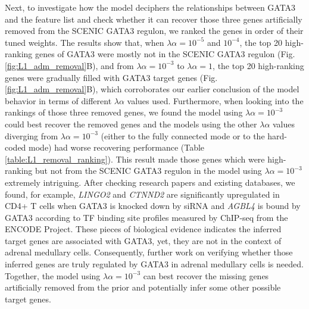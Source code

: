 Next, to investigate how the model deciphers the relationships between GATA3 and the feature list and check whether it can recover those three genes artificially removed from the SCENIC GATA3 regulon, we ranked the genes in order of their tuned weights. The results show that, when $\lambda\alpha = 10^{-5}$ and $10^{-4}$, the top 20 high-ranking genes of GATA3 were mostly not in the SCENIC GATA3 regulon (Fig.\ref{fig:L1_adm_removal}B), and from $\lambda\alpha = 10^{-3}$ to $\lambda\alpha = 1$, the top 20 high-ranking genes were gradually filled with GATA3 target genes (Fig.\ref{fig:L1_adm_removal}B), which corroborates our earlier conclusion of the model behavior in terms of different $\lambda\alpha$ values used. Furthermore, when looking into the rankings of those three removed genes, we found the model using $\lambda\alpha = 10^{-3}$ could best recover the removed genes and the models using the other $\lambda\alpha$ values diverging from $\lambda\alpha = 10^{-3}$ (either to the fully connected mode or to the hard-coded mode) had worse recovering performance (Table \ref{table:L1_removal_ranking}). This result made those genes which were high-ranking but not from the SCENIC GATA3 regulon in the model using $\lambda\alpha = 10^{-3}$ extremely intriguing. After checking research papers and existing databases, we found, for example, \textit{LINGO2} and \textit{CTNND2} are significantly upregulated in CD4+ T cells when GATA3 is knocked down by siRNA\cite{Feng2020} and \textit{AGBL4} is bound by GATA3 according to TF binding site profiles measured by ChIP-seq from the ENCODE Project\cite{ENCODE2004,ENCODE2011,Rouillard2016}. These pieces of biological evidence indicates the inferred target genes are associated with GATA3, yet, they are not in the context of adrenal medullary cells. Consequently, further work on verifying whether those inferred genes are truly regulated by GATA3 in adrenal medullary cells is needed. Together, the model using $\lambda\alpha = 10^{-3}$ can best recover the missing genes artificially removed from the prior and potentially infer some other possible target genes.

